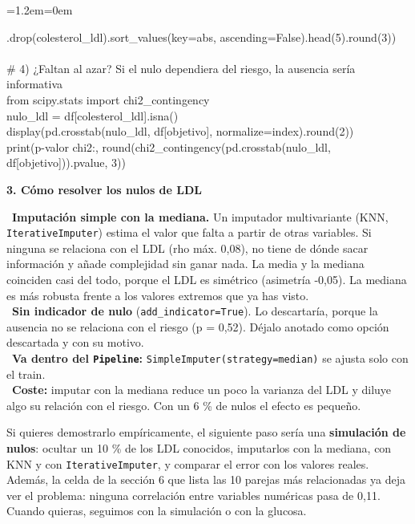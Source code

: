 \documentclass[11pt,a4paper]{article}
\newenvironment{codigo}
  {\par\smallskip\begin{list}{}{\leftmargin=1.2em\rightmargin=0em}\item\relax\ttfamily\scriptsize\raggedright}
  {\end{list}\smallskip}
\begin{document}
{\begin{codigo}
\hspace*{4.16em}.drop(\textquotedbl{}colesterol\_\allowbreak{}ldl\textquotedbl{}).sort\_\allowbreak{}values(key=abs, ascending=False).head(5).round(3)) \\{}
\mbox{} \\{}
\# 4) ¿Faltan al azar? Si el nulo dependiera del riesgo, la ausencia sería informativa \\{}
from scipy.stats import chi2\_\allowbreak{}contingency \\{}
nulo\_\allowbreak{}ldl = df[\textquotedbl{}colesterol\_\allowbreak{}ldl\textquotedbl{}].isna() \\{}
display(pd.crosstab(nulo\_\allowbreak{}ldl, df[objetivo], normalize=\textquotedbl{}index\textquotedbl{}).round(2)) \\{}
print(\textquotedbl{}p-valor chi2:\textquotedbl{}, round(chi2\_\allowbreak{}contingency(pd.crosstab(nulo\_\allowbreak{}ldl, df[objetivo])).pvalue, 3))
\end{codigo}
\smallskip\noindent\textbf{3. Cómo resolver los nulos de LDL}\par
\hspace*{1.0em}\textbullet~\textbf{Imputación simple con la mediana.} Un imputador multivariante (KNN, \texttt{IterativeImputer}) estima el valor que falta a partir de otras variables. Si ninguna se relaciona con el LDL (rho máx. 0,08), no tiene de dónde sacar información y añade complejidad sin ganar nada. La media y la mediana coinciden casi del todo, porque el LDL es simétrico (asimetría -0,05). La mediana es más robusta frente a los valores extremos que ya has visto. \\{}
\hspace*{1.0em}\textbullet~\textbf{Sin indicador de nulo} (\texttt{add\_\allowbreak{}indicator=True}). Lo descartaría, porque la ausencia no se relaciona con el riesgo (p = 0,52). Déjalo anotado como opción descartada y con su motivo. \\{}
\hspace*{1.0em}\textbullet~\textbf{Va dentro del \texttt{Pipeline}:} \texttt{SimpleImputer(strategy=\textquotedbl{}median\textquotedbl{})} se ajusta solo con el train. \\{}
\hspace*{1.0em}\textbullet~\textbf{Coste:} imputar con la mediana reduce un poco la varianza del LDL y diluye algo su relación con el riesgo. Con un 6 \% de nulos el efecto es pequeño.

Si quieres demostrarlo empíricamente, el siguiente paso sería una \textbf{simulación de nulos}: ocultar un 10 \% de los LDL conocidos, imputarlos con la mediana, con KNN y con \texttt{IterativeImputer}, y comparar el error con los valores reales. Además, la celda de la sección 6 que lista las 10 parejas más relacionadas ya deja ver el problema: ninguna correlación entre variables numéricas pasa de 0,11. Cuando quieras, seguimos con la simulación o con la glucosa.

}
\end{document}
